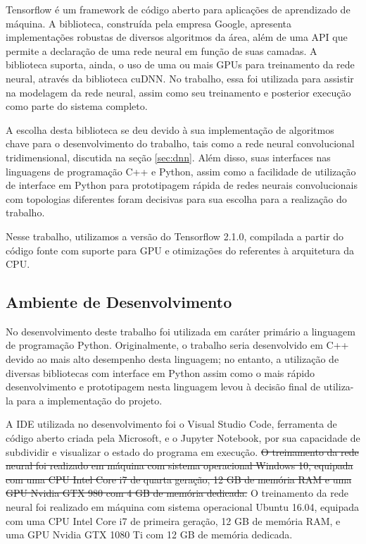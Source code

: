 Tensorflow\cite{tensorflow2015-whitepaper} é um framework de código aberto para aplicações de aprendizado de máquina. A biblioteca, construída pela empresa Google, apresenta implementações robustas de diversos algoritmos da área, além de uma API que permite a declaração de uma rede neural em função de suas camadas. A biblioteca suporta, ainda, o uso de uma ou mais GPUs para treinamento da rede neural, através da biblioteca cuDNN. No trabalho, essa foi utilizada para assistir na modelagem da rede neural, assim como seu treinamento e posterior execução como parte do sistema completo.

A escolha desta biblioteca se deu devido à sua implementação de algoritmos chave para o desenvolvimento do trabalho, tais como a rede neural convolucional tridimensional, discutida na seção \ref{sec:dnn}. Além disso, suas interfaces nas linguagens de programação C++ e Python, assim como a facilidade de utilização de interface em Python para prototipagem rápida de redes neurais convolucionais com topologias diferentes foram decisivas para sua escolha para a realização do trabalho.

Nesse trabalho, utilizamos a versão do Tensorflow 2.1.0, compilada a partir do código fonte com suporte para GPU e otimizações do referentes à arquitetura da CPU.

\subsection{Ambiente de Desenvolvimento}
\label{subsec:environ}

No desenvolvimento deste trabalho foi utilizada em caráter primário a linguagem de programação Python. Originalmente, o trabalho seria desenvolvido em C++ devido ao mais alto desempenho desta linguagem; no entanto, a utilização de diversas bibliotecas com interface em Python assim como o mais rápido desenvolvimento e prototipagem nesta linguagem levou à decisão final de utiliza-la para a implementação do projeto.

A IDE utilizada no desenvolvimento foi o Visual Studio Code, ferramenta de código aberto criada pela Microsoft, e o Jupyter Notebook\cite{Kluyver:2016aa}, por sua capacidade de subdividir e visualizar o estado do programa em execução. \sout{O treinamento da rede neural foi realizado em máquina com sistema operacional Windows 10, equipada com uma CPU Intel Core i7 de quarta geração, 12 GB de memória RAM e uma GPU Nvidia GTX 980 com 4 GB de memória dedicada.} O treinamento da rede neural foi realizado em máquina com sistema operacional Ubuntu 16.04, equipada com uma CPU Intel Core i7 de primeira geração, 12 GB de memória RAM, e uma GPU Nvidia GTX 1080 Ti com 12 GB de memória dedicada.

